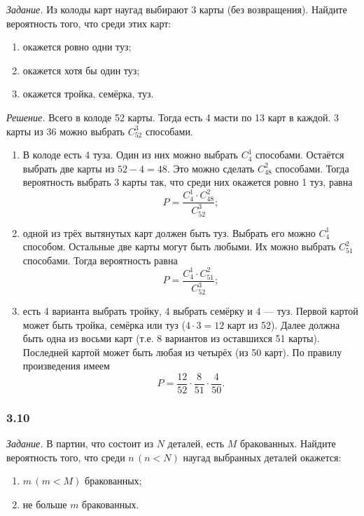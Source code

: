 \textit{Задание.} Из колоды карт наугад выбирают 3 карты (без возвращения).
Найдите вероятность того, что среди этих карт:
\begin{enumerate}[label=\alph*)]
\item окажется ровно одни туз;
\item окажется хотя бы один туз;
\item окажется тройка, семёрка, туз.
\end{enumerate}

\textit{Решение.} Всего в колоде 52 карты.
Тогда есть 4 масти по 13 карт в каждой.
3 карты из 36 можно выбрать $C_{52}^3$ способами.

\begin{enumerate}[label=\alph*)]
\item В колоде есть 4 туза.
Один из них можно выбрать $C_4^1$ способами.
Остаётся выбрать две карты из $52-4=48$.
Это можно сделать $C_{48}^2$ способами.
Тогда вероятность выбрать 3 карты так, что среди них окажется ровно 1 туз, равна
$$P =
\frac{C_4^1 \cdot C_{48}^2}{C_{52}^3};$$

\item одной из трёх вытянутых карт должен быть туз.
Выбрать его можно $C_4^1$ способом.
Остальные две карты могут быть любыми.
Их можно выбрать $C_{51}^2$ способами.
Тогда вероятность равна
$$P =
\frac{C_4^1 \cdot C_{51}^2}{C_{52}^3};$$

\item есть 4 варианта выбрать тройку, 4 выбрать семёрку и 4 --- туз.
Первой картой может быть тройка, семёрка или туз ($4 \cdot 3 = 12$ карт из 52).
Далее должна быть одна из восьми карт (т.е. 8 вариантов из оставшихся 51 карты).
Последней картой может быть любая из четырёх (из 50 карт).
По правилу произведения имеем
$$P =
\frac{12}{52} \cdot \frac{8}{51} \cdot \frac{4}{50}.$$
\end{enumerate}

\subsubsection*{3.10}

\textit{Задание.} В партии, что состоит из $N$ деталей, есть $M$ бракованных.
Найдите вероятность того, что среди $n \, \left( n < N \right)$ наугад выбранных деталей окажется:
\begin{enumerate}[label=\alph*)]
\item $m \, \left( m < M \right) $ бракованных;
\item не больше $m$ бракованных.
\end{enumerate}

